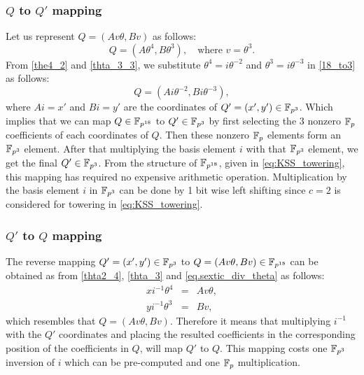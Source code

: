         \subsubsection{$Q$ to $Q'$ mapping}
        Let us represent $Q = (Av\theta, Bv)$  as follows:
        \begin{equation}\label{18_to3}
        Q  =  (A\theta^4, B\theta^3), \quad \text{where $v=\theta^3$}.
        \end{equation}
        From \eqref{the4_2} and \eqref{thta_3_3}, we substitute $ \theta^4 = i\theta^{-2}$ and $\theta^3 = i\theta^{-3}$  in \eqref{18_to3}  as 
        follows:
        \begin{equation}\label{18_to3.1}
        Q  =  (Ai\theta^{-2}, Bi\theta^{-3}),
        \end{equation}
        where $Ai = x'$ and $Bi = y'$ are the coordinates of $Q' =(x',y') \in \mathbb{F}_{p^3}$. Which implies that we can map $Q \in \mathbb{F}_{p^{18}}$ to $Q' \in \mathbb{F}_{p^3}$ by first selecting the $3$ nonzero ${\mathbb{F}}_{p}$ coefficients of each coordinates of $Q$. Then these nonzero ${\mathbb{F}}_{p}$ elements form an $\mathbb{F}_{p^3}$ element. After that multiplying the basis element $i$ with that $\mathbb{F}_{p^3}$ element, we get the final $Q' \in \mathbb{F}_{p^3}$. From the structure of $\mathbb{F}_{p^{18}}$, given in \eqref{eq:KSS_towering}, this mapping has required no expensive arithmetic operation.  Multiplication by the basis element $i$ in $\mathbb{F}_{p^3}$ can be done by 1 bit wise left shifting since $c=2$ is considered for towering in \eqref{eq:KSS_towering}.
        
        \subsubsection{$Q'$ to $Q$ mapping}
         The reverse mapping $Q' =(x',y') \in \mathbb{F}_{p^3}$ to $Q =(Av\theta,Bv) \in \mathbb{F}_{p^{18}}$ can be obtained as from \eqref{thta2_4}, \eqref{thta_3} and \eqref{eq.sextic_div_theta} as follows:
         \begin{subequations}
         \begin{eqnarray}
         x i^{-1}\theta^{4} & = & Av\theta, \nonumber \\
         y i^{-1}\theta^{3} & = & Bv, \nonumber
         \end{eqnarray}
         \end{subequations}
          which resembles that $Q= (Av\theta, Bv)$. Therefore it means that multiplying $i^{-1}$ with the $Q'$ coordinates and placing the resulted coefficients in the corresponding position of the coefficients in $Q$, will map $Q'$ to $Q$.
        This mapping costs one $\mathbb{F}_{p^3}$ inversion of $i$ which can be pre-computed and one ${\mathbb{F}}_{p}$ multiplication.
        
